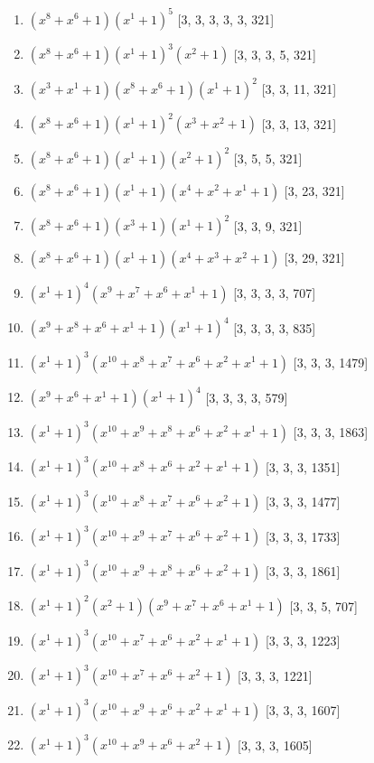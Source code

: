 \documentclass[10pt,twocolumn]{article}
\begin{document}
\begin{enumerate}
\item $(x^{8} + x^{6} + 1)(x^{1} + 1)^{5}$  [3, 3, 3, 3, 3, 321]
\item $(x^{8} + x^{6} + 1)(x^{1} + 1)^{3}(x^{2} + 1)$  [3, 3, 3, 5, 321]
\item $(x^{3} + x^{1} + 1)(x^{8} + x^{6} + 1)(x^{1} + 1)^{2}$  [3, 3, 11, 321]
\item $(x^{8} + x^{6} + 1)(x^{1} + 1)^{2}(x^{3} + x^{2} + 1)$  [3, 3, 13, 321]
\item $(x^{8} + x^{6} + 1)(x^{1} + 1)(x^{2} + 1)^{2}$  [3, 5, 5, 321]
\item $(x^{8} + x^{6} + 1)(x^{1} + 1)(x^{4} + x^{2} + x^{1} + 1)$  [3, 23, 321]
\item $(x^{8} + x^{6} + 1)(x^{3} + 1)(x^{1} + 1)^{2}$  [3, 3, 9, 321]
\item $(x^{8} + x^{6} + 1)(x^{1} + 1)(x^{4} + x^{3} + x^{2} + 1)$  [3, 29, 321]
\item $(x^{1} + 1)^{4}(x^{9} + x^{7} + x^{6} + x^{1} + 1)$  [3, 3, 3, 3, 707]
\item $(x^{9} + x^{8} + x^{6} + x^{1} + 1)(x^{1} + 1)^{4}$  [3, 3, 3, 3, 835]
\item $(x^{1} + 1)^{3}(x^{10} + x^{8} + x^{7} + x^{6} + x^{2} + x^{1} + 1)$  [3, 3, 3, 1479]
\item $(x^{9} + x^{6} + x^{1} + 1)(x^{1} + 1)^{4}$  [3, 3, 3, 3, 579]
\item $(x^{1} + 1)^{3}(x^{10} + x^{9} + x^{8} + x^{6} + x^{2} + x^{1} + 1)$  [3, 3, 3, 1863]
\item $(x^{1} + 1)^{3}(x^{10} + x^{8} + x^{6} + x^{2} + x^{1} + 1)$  [3, 3, 3, 1351]
\item $(x^{1} + 1)^{3}(x^{10} + x^{8} + x^{7} + x^{6} + x^{2} + 1)$  [3, 3, 3, 1477]
\item $(x^{1} + 1)^{3}(x^{10} + x^{9} + x^{7} + x^{6} + x^{2} + 1)$  [3, 3, 3, 1733]
\item $(x^{1} + 1)^{3}(x^{10} + x^{9} + x^{8} + x^{6} + x^{2} + 1)$  [3, 3, 3, 1861]
\item $(x^{1} + 1)^{2}(x^{2} + 1)(x^{9} + x^{7} + x^{6} + x^{1} + 1)$  [3, 3, 5, 707]
\item $(x^{1} + 1)^{3}(x^{10} + x^{7} + x^{6} + x^{2} + x^{1} + 1)$  [3, 3, 3, 1223]
\item $(x^{1} + 1)^{3}(x^{10} + x^{7} + x^{6} + x^{2} + 1)$  [3, 3, 3, 1221]
\item $(x^{1} + 1)^{3}(x^{10} + x^{9} + x^{6} + x^{2} + x^{1} + 1)$  [3, 3, 3, 1607]
\item $(x^{1} + 1)^{3}(x^{10} + x^{9} + x^{6} + x^{2} + 1)$  [3, 3, 3, 1605]

\end{enumerate}
\end{document}
